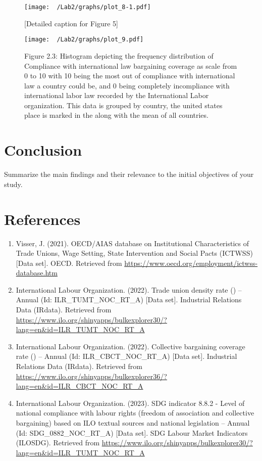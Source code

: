 \documentclass[11pt]{article}\usepackage[]{graphicx}\usepackage[]{xcolor}
\begin{document}
\begin{figure}[h]
\centering
\texttt{[image: ~/Lab2/graphs/plot\_8-1.pdf]}
\caption{[Detailed caption for Figure 5]}
\label{fig:2.2}
\end{figure}

\begin{figure}[h]
\centering
\texttt{[image: ~/Lab2/graphs/plot\_9.pdf]}
\caption{Figure 2.3: Histogram depicting the frequency distribution of Compliance with international law bargaining coverage as scale from 0 to 10 with 10 being the most out of compliance with international law a country could be, and 0 being completely incompliance with international labor law recorded by the International Labor organization. This data is grouped by country, the united states place is marked in the along with the mean of all countries.}
\label{fig:2.3}
\end{figure}

\clearpage
\section{Conclusion}
Summarize the main findings and their relevance to the initial objectives of your study.


\clearpage
\section{References}
\begin{enumerate}
    \item Visser, J. (2021). OECD/AIAS database on Institutional Characteristics of Trade Unions, Wage Setting, 
      State Intervention and Social Pacts (ICTWSS) [Data set]. OECD. 
      Retrieved from 
      \url{https://www.oecd.org/employment/ictwss-database.htm}
    \item International Labour Organization. (2022). Trade union density rate () 
      -- Annual (Id: ILR\_TUMT\_NOC\_RT\_A) [Data set]. Industrial Relations Data (IRdata). 
      Retrieved from 
      \url{https://www.ilo.org/shinyapps/bulkexplorer30/?lang=en\&id=ILR\_TUMT\_NOC\_RT\_A}
    \item International Labour Organization. (2022). Collective bargaining coverage 
      rate () -- Annual (Id: ILR\_CBCT\_NOC\_RT\_A) [Data set]. 
      Industrial Relations Data (IRdata). Retrieved from 
      \url{https://www.ilo.org/shinyapps/bulkexplorer36/?lang=en\&id=ILR\_CBCT\_NOC\_RT\_A}
    \item International Labour Organization. (2023). SDG indicator 8.8.2 - 
      Level of national compliance with labour rights
      (freedom of association and collective bargaining) 
      based on ILO textual sources and national legislation -- 
      Annual (Id: SDG\_0882\_NOC\_RT\_A) [Data set]. 
      SDG Labour Market Indicators (ILOSDG). Retrieved 
      from \url{https://www.ilo.org/shinyapps/bulkexplorer30/?lang=en\&id=ILR\_TUMT\_NOC\_RT\_A}
\end{enumerate}
\end{document}
